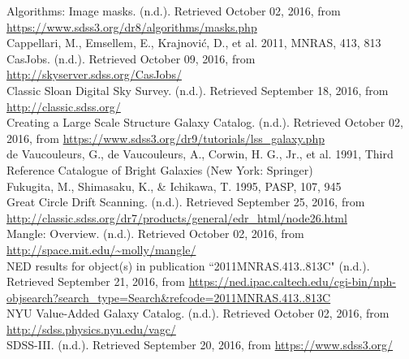 \documentclass[10pt,letterpaper]{article}
\begin{document}
\newpage
\center
\begin{thebibliography}{1}
 Algorithms: Image masks. (n.d.). Retrieved October 02, 2016, from \url{https://www.sdss3.org/dr8/algorithms/masks.php}\\

 Cappellari, M., Emsellem, E., Krajnovi\'c, D., et al. 2011, MNRAS, 413, 813\\

CasJobs. (n.d.). Retrieved October 09, 2016, from \url{http://skyserver.sdss.org/CasJobs/}\\


 Classic Sloan Digital Sky Survey. (n.d.). Retrieved September 18, 2016, from \url{http://classic.sdss.org/}\\

 Creating a Large Scale Structure Galaxy Catalog. (n.d.). Retrieved October 02, 2016, from \url{https://www.sdss3.org/dr9/tutorials/lss_galaxy.php}\\

 de Vaucouleurs, G., de Vaucouleurs, A., Corwin, H. G., Jr., et al. 1991, Third
Reference Catalogue of Bright Galaxies (New York: Springer)\\

 Fukugita, M., Shimasaku, K., \& Ichikawa, T. 1995, PASP, 107, 945\\

 Great Circle Drift Scanning. (n.d.). Retrieved September 25, 2016, from \url{http://classic.sdss.org/dr7/products/general/edr_html/node26.html}\\

 Mangle: Overview. (n.d.). Retrieved October 02, 2016, from \url{http://space.mit.edu/~molly/mangle/}\\

 NED results for object(s) in publication ``2011MNRAS.413..813C" (n.d.). Retrieved September 21, 2016, from \url{https://ned.ipac.caltech.edu/cgi-bin/nph-objsearch?search_type=Search&refcode=2011MNRAS.413..813C}\\

 NYU Value-Added Galaxy Catalog. (n.d.). Retrieved October 02, 2016, from \url{http://sdss.physics.nyu.edu/vagc/}\\

 SDSS-III. (n.d.). Retrieved September 20, 2016, from \url{https://www.sdss3.org/}\\


\end{thebibliography}
\end{document}

